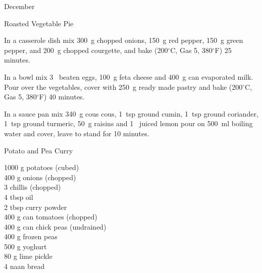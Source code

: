 \begin{menu}{December}
\begin{recipe}{2}{Roasted Vegetable Pie}
    \begin{instructions}
    \item 
        In a casserole dish mix
        300~g chopped onions,
        150~g  red pepper,
        150~g  green pepper,
        and
        200~g chopped courgette,
        and bake (200$^{\circ}$C, Gas 5, 380$^{\circ}$F) 25 minutes.
      \item 
        In a bowl mix
        3~ beaten eggs,
        100~g  feta cheese
        and
        400~g  can evaporated milk.
        Pour over the vegetables,
        cover with
        250~g  ready made pastry
        and bake (200$^{\circ}$C, Gas 5, 380$^{\circ}$F) 40 minutes.
      \item 
    In a
    sauce pan
    mix
    340~g  cous cous,
    1~tsp  ground cumin,
    1~tsp  ground coriander,
    1~tsp  ground turmeric,
    50~g  raisins
    and
    1~ juiced lemon
    pour on
    500~ml  boiling water
    and cover, leave to stand for 10 minutes.
  
    \end{instructions}
    \end{recipe}%
  
    \begin{recipe}{2}{Potato and Pea Curry}%
		\begin{ingredients}
		1000 g potatoes (cubed) \\
	400 g onions (chopped) \\
	3  chillis (chopped) \\
	4 tbsp oil  \\
	2 tbsp curry powder  \\
	400 g can tomatoes (chopped) \\
	400 g can chick peas (undrained) \\
	400 g frozen peas  \\
	500 g yoghurt  \\
	80 g lime pickle  \\
	4  naan bread  \\
	
		\end{ingredients}
	
	
	

\end{recipe}
\end{menu}
